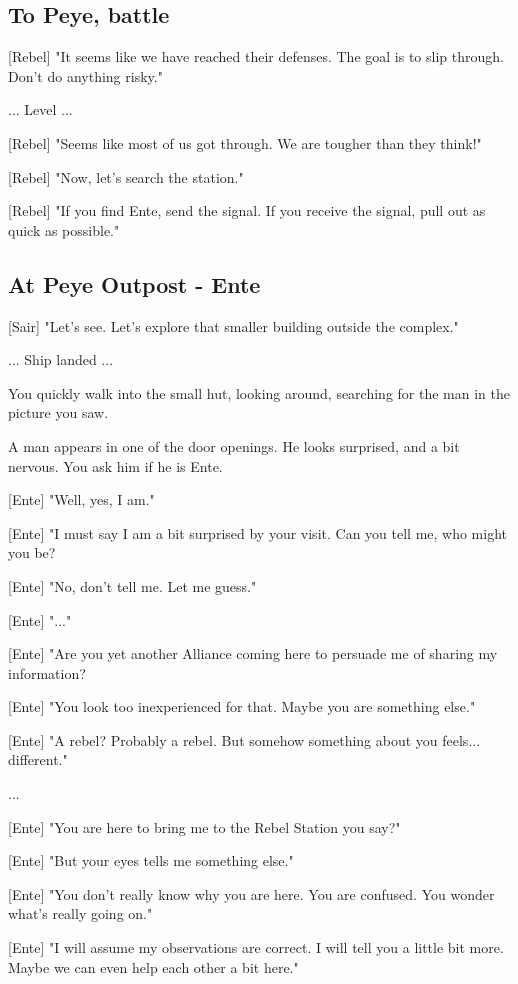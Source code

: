 \documentclass[a4paper,12pt]{article}
\begin{document}
\subsection{To Peye, battle}

[Rebel] "It seems like we have reached their defenses. The goal is to slip through. Don't do anything risky."

... Level ...

[Rebel] "Seems like most of us got through. We are tougher than they think!" 

[Rebel] "Now, let's search the station."

[Rebel] "If you find Ente, send the signal. If you receive the signal, pull out as quick as possible."

\subsection{At Peye Outpost - Ente}

[Sair] "Let's see. Let's explore that smaller building outside the complex."

... Ship landed ...

You quickly walk into the small hut, looking around, searching for the man in the picture you saw.

A man appears in one of the door openings. He looks surprised, and a bit nervous. You ask him if he is Ente.

[Ente] "Well, yes, I am." 

[Ente] "I must say I am a bit surprised by your visit. Can you tell me, who might you be? 

[Ente] "No, don't tell me. Let me guess."

[Ente] "..."

[Ente] "Are you yet another Alliance coming here to persuade me of sharing my information? 

[Ente] "You look too inexperienced for that. Maybe you are something else." 

[Ente] "A rebel? Probably a rebel. But somehow something about you feels... different."

...

[Ente] "You are here to bring me to the Rebel Station you say?"

[Ente] "But your eyes tells me something else." 

[Ente] "You don't really know why you are here. You are confused. You wonder what's really going on."

[Ente] "I will assume my observations are correct. I will tell you a little bit more. 
Maybe we can even help each other a bit here."
\end{document}
